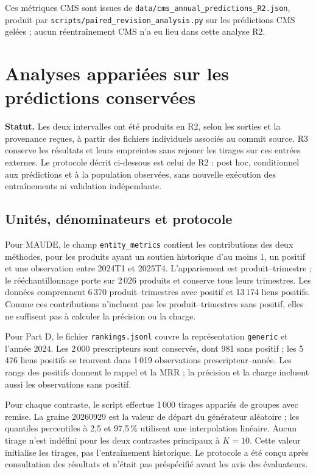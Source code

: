 \documentclass[10pt,a4paper]{article}
\newcommand{\src}[1]{{\small\nolinkurl{#1}}}
\begin{document}
Ces métriques CMS sont issues de \src{data/cms_annual_predictions_R2.json}, produit par \src{scripts/paired_revision_analysis.py} sur les prédictions CMS gelées ; aucun réentraînement CMS n'a eu lieu dans cette analyse R2.

\section{Analyses appariées sur les prédictions conservées}
\label{supp:bootstrap}
\textbf{Statut.} Les deux intervalles ont été produits en R2, selon les sorties et la provenance reçues, à partir des fichiers individuels associés au commit source. R3 conserve les résultats et leurs empreintes sans rejouer les tirages sur ces entrées externes. Le protocole décrit ci-dessous est celui de R2 : post hoc, conditionnel aux prédictions et à la population observées, sans nouvelle exécution des entraînements ni validation indépendante.

\subsection{Unités, dénominateurs et protocole}
Pour MAUDE, le champ \src{entity_metrics} contient les contributions des deux méthodes, pour les produits ayant un soutien historique d'au moins 1, un positif et une observation entre 2024T1 et 2025T4. L'appariement est produit--trimestre ; le rééchantillonnage porte sur 2\,026 produits et conserve tous leurs trimestres. Les données comprennent 6\,370 produit--trimestres avec positif et 13\,174 liens positifs. Comme ces contributions n'incluent pas les produit--trimestres sans positif, elles ne suffisent pas à calculer la précision ou la charge.

Pour Part D, le fichier \src{rankings.jsonl} couvre la représentation \src{generic} et l'année 2024. Les 2\,000 prescripteurs sont conservés, dont 981 sans positif ; les 5\,476 liens positifs se trouvent dans 1\,019 observations prescripteur--année. Les rangs des positifs donnent le rappel et la MRR ; la précision et la charge incluent aussi les observations sans positif.

Pour chaque contraste, le script effectue 1\,000 tirages appariés de groupes avec remise. La graine 20260929 est la valeur de départ du générateur aléatoire ; les quantiles percentiles à 2,5 et 97,5\,\% utilisent une interpolation linéaire. Aucun tirage n'est indéfini pour les deux contrastes principaux à $K=10$. Cette valeur initialise les tirages, pas l'entraînement historique. Le protocole a été conçu après consultation des résultats et n'était pas préspécifié avant les avis des évaluateurs.
\end{document}
